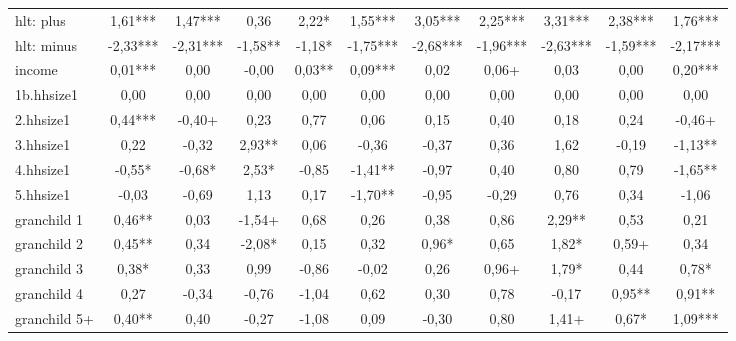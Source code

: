 {\begin{tabular}{l*{10}{c}}
hlt: plus   &        1,61***&        1,47***&        0,36   &        2,22*  &        1,55***&        3,05***&        2,25***&        3,31***&        2,38***&        1,76***\\
hlt: minus  &       -2,33***&       -2,31***&       -1,58** &       -1,18*  &       -1,75***&       -2,68***&       -1,96***&       -2,63***&       -1,59***&       -2,17***\\
income      &        0,01***&        0,00   &       -0,00   &        0,03** &        0,09***&        0,02   &        0,06+  &        0,03   &        0,00   &        0,20***\\
1b.hhsize1  &        0,00   &        0,00   &        0,00   &        0,00   &        0,00   &        0,00   &        0,00   &        0,00   &        0,00   &        0,00   \\
2.hhsize1   &        0,44***&       -0,40+  &        0,23   &        0,77   &        0,06   &        0,15   &        0,40   &        0,18   &        0,24   &       -0,46+  \\
3.hhsize1   &        0,22   &       -0,32   &        2,93** &        0,06   &       -0,36   &       -0,37   &        0,36   &        1,62   &       -0,19   &       -1,13** \\
4.hhsize1   &       -0,55*  &       -0,68*  &        2,53*  &       -0,85   &       -1,41** &       -0,97   &        0,40   &        0,80   &        0,79   &       -1,65** \\
5.hhsize1   &       -0,03   &       -0,69   &        1,13   &        0,17   &       -1,70** &       -0,95   &       -0,29   &        0,76   &        0,34   &       -1,06   \\
granchild 1 &        0,46** &        0,03   &       -1,54+  &        0,68   &        0,26   &        0,38   &        0,86   &        2,29** &        0,53   &        0,21   \\
granchild 2 &        0,45** &        0,34   &       -2,08*  &        0,15   &        0,32   &        0,96*  &        0,65   &        1,82*  &        0,59+  &        0,34   \\
granchild 3 &        0,38*  &        0,33   &        0,99   &       -0,86   &       -0,02   &        0,26   &        0,96+  &        1,79*  &        0,44   &        0,78*  \\
granchild 4 &        0,27   &       -0,34   &       -0,76   &       -1,04   &        0,62   &        0,30   &        0,78   &       -0,17   &        0,95** &        0,91** \\
granchild 5+&        0,40** &        0,40   &       -0,27   &       -1,08   &        0,09   &       -0,30   &        0,80   &        1,41+  &        0,67*  &        1,09***\\

\end{tabular}}
